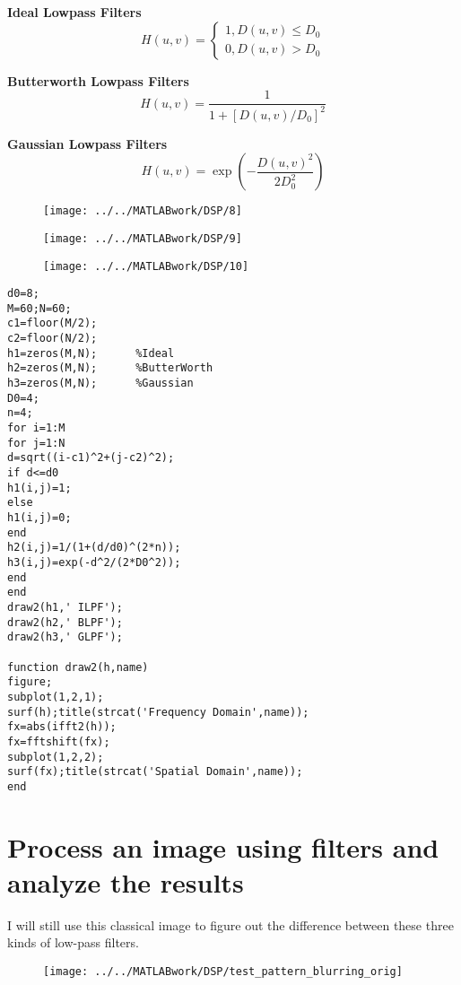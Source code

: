 \documentclass[12pt,a4paper]{article}
\begin{document}
\textbf{Ideal Lowpass Filters}
$$ H(u,v)=\left\{
\begin{aligned}
1 , D(u,v)\leq D_0\\
0 , D(u,v)> D_0 
\end{aligned}
\right.
$$

\textbf{Butterworth Lowpass Filters}
$$H(u,v)=\dfrac{1}{1+[D(u,v)/D_0]^2}$$


\textbf{Gaussian Lowpass Filters}
$$H(u,v)=\exp(-\dfrac{D(u,v)^2}{2D_0^2})$$
\begin{figure}[ht]
	\begin{center}
		\texttt{[image: ../../MATLABwork/DSP/8]}
	\end{center}
\end{figure}

\begin{figure}[ht]
	\begin{center}
		\texttt{[image: ../../MATLABwork/DSP/9]}
	\end{center}
\end{figure}

\begin{figure}[ht]
	\begin{center}
		\texttt{[image: ../../MATLABwork/DSP/10]}
	\end{center}
\end{figure}

\newpage
\lstset{language=Matlab}
\begin{lstlisting}
d0=8;
M=60;N=60;
c1=floor(M/2);     
c2=floor(N/2);      
h1=zeros(M,N);      %Ideal
h2=zeros(M,N);      %ButterWorth
h3=zeros(M,N);      %Gaussian
D0=4;
n=4;
for i=1:M
for j=1:N
d=sqrt((i-c1)^2+(j-c2)^2);
if d<=d0
h1(i,j)=1;
else
h1(i,j)=0;
end
h2(i,j)=1/(1+(d/d0)^(2*n)); 
h3(i,j)=exp(-d^2/(2*D0^2)); 
end
end
draw2(h1,' ILPF');
draw2(h2,' BLPF');
draw2(h3,' GLPF');

function draw2(h,name)
figure;
subplot(1,2,1);
surf(h);title(strcat('Frequency Domain',name));
fx=abs(ifft2(h));
fx=fftshift(fx);
subplot(1,2,2);
surf(fx);title(strcat('Spatial Domain',name));
end
\end{lstlisting}

\section{Process an image using filters and analyze the results}
I will still use this classical image to figure out the difference between these three kinds of low-pass filters.
\begin{figure}[ht]
	\begin{center}
		\texttt{[image: ../../MATLABwork/DSP/test\_pattern\_blurring\_orig]}
	\end{center}
\end{figure}
\end{document}
